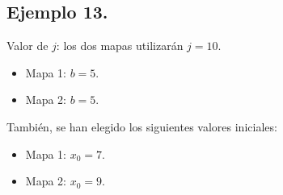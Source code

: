 \documentclass[10pt]{IEEEtran}
\begin{document}
\subsection{Ejemplo 13.}
Valor de $j$: los dos mapas utilizarán $j=10$. 

\begin{itemize}
\item Mapa 1: $b =  5$.
\item Mapa 2: $b =  5$.
\end{itemize}

También, se han elegido los siguientes valores iniciales:

\begin{itemize}
\item Mapa 1: $x_{0} = 7$.
\item Mapa 2: $x_{0} = 9$.
\end{itemize}
\end{document}
